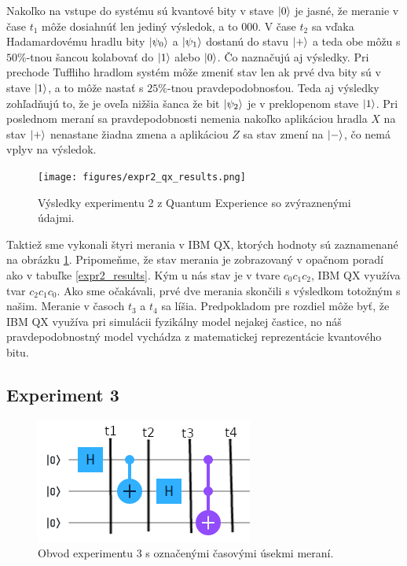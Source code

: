 Nakoľko na vstupe do systému sú kvantové bity v stave \(\ket{0}\) je jasné, že
meranie v čase \(t_1\) môže dosiahnúť len jediný výsledok, a to  \(000\).
V čase \(t_2\) sa vďaka Hadamardovému hradlu bity \(\ket{\psi_0}\) a 
\(\ket{\psi_1}\) dostanú do stavu \(\ket{+}\) a teda obe môžu s \(50\%\)-tnou
šancou kolabovať do \(\ket{1}\) alebo \(\ket{0}\). Čo naznačujú aj výsledky.
Pri prechode Tuffliho hradlom systém môže zmeniť stav len ak prvé dva bity sú 
v stave \(\ket{1}\), a to môže nastať s \(25\%\)-tnou pravdepodobnosťou. Teda
aj výsledky zohľadňujú to, že je oveľa nižšia šanca že bit \(\ket{\psi_2}\)
je v preklopenom stave \(\ket{1}\). Pri poslednom meraní sa pravdepodobnosti
nemenia nakoľko aplikáciou hradla \(X\) na stav \(\ket{+}\) nenastane žiadna
zmena a aplikáciou \(Z\) sa stav zmení na \(\ket{-}\), čo nemá vplyv na
výsledok.

\begin{figure} 
	\centering 
	\texttt{[image: figures/expr2\_qx\_results.png]} 
	\caption{Výsledky experimentu 2 z Quantum Experience so zvýraznenými 
údajmi.}

    \label{expr2_qx_results}
\end{figure}

Taktiež sme vykonali štyri merania v IBM QX, ktorých hodnoty sú zaznamenané
na obrázku \ref{expr2_qx_results}. Pripomeňme, že stav merania je zobrazovaný
v opačnom poradí ako v tabuľke \ref{expr2_results}. Kým u nás stav je 
v tvare \(c_0c_1c_2\), IBM QX využíva tvar \(c_2c_1c_0\). Ako sme očakávali, 
prvé dve merania skončili s výsledkom totožným s našim. Meranie v časoch 
\(t_3\) a \(t_4\) sa líšia. Predpokladom pre rozdiel môže byť, že IBM QX 
využíva pri simulácii fyzikálny model nejakej častice, no náš pravdepodobnostný
model vychádza z matematickej reprezentácie kvantového bitu.

\subsection{Experiment 3}

\begin{figure} 
	\centering 
	\includegraphics[width=.6\textwidth]{figures/expr3_circuit.png} 
	\caption{Obvod experimentu 3 s označenými časovými úsekmi meraní.}
    \label{expr3_circuit}
\end{figure}

